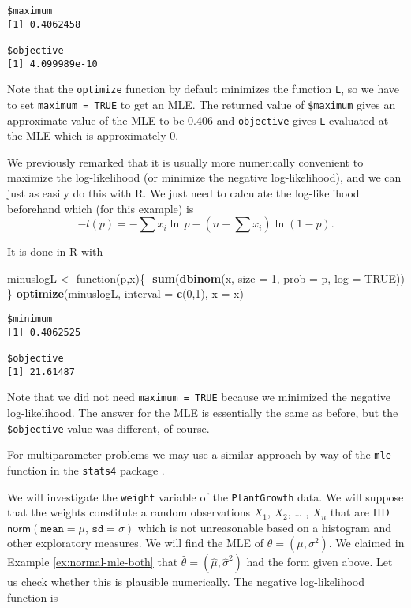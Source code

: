 \documentclass[]{book}
\newenvironment{Shaded}{\begin{snugshade}}{\end{snugshade}}
\newcommand{\KeywordTok}[1]{\textcolor[rgb]{0.13,0.29,0.53}{\textbf{{#1}}}}
\newcommand{\DataTypeTok}[1]{\textcolor[rgb]{0.13,0.29,0.53}{{#1}}}
\newcommand{\DecValTok}[1]{\textcolor[rgb]{0.00,0.00,0.81}{{#1}}}
\newcommand{\StringTok}[1]{\textcolor[rgb]{0.31,0.60,0.02}{{#1}}}
\newcommand{\OtherTok}[1]{\textcolor[rgb]{0.56,0.35,0.01}{{#1}}}
\newcommand{\NormalTok}[1]{{#1}}
\numberwithin{equation}{chapter}
\numberwithin{figure}{chapter}
\theoremstyle{plain}
\theoremstyle{definition}
\theoremstyle{remark}
\theoremstyle{definition}
\theoremstyle{definition}
\theoremstyle{remark}
\let\BeginKnitrBlock\begin \let\EndKnitrBlock\end
\begin{document}
\begin{verbatim}
$maximum
[1] 0.4062458

$objective
[1] 4.099989e-10
\end{verbatim}

Note that the \texttt{optimize} function by default minimizes the
function \texttt{L}, so we have to set \texttt{maximum\ =\ TRUE} to get
an MLE. The returned value of \texttt{\$maximum} gives an approximate
value of the MLE to be 0.406 and \texttt{objective} gives \texttt{L}
evaluated at the MLE which is approximately 0.

We previously remarked that it is usually more numerically convenient to
maximize the log-likelihood (or minimize the negative log-likelihood),
and we can just as easily do this with R. We just need to calculate the
log-likelihood beforehand which (for this example) is
\[ -l(p)=-\sum x_{i}\ln\,
p-\left(n-\sum x_{i}\right)\ln(1-p).  \]

It is done in R with

\begin{Shaded}
\begin{Highlighting}[]
\NormalTok{minuslogL <-}\StringTok{ }\NormalTok{function(p,x)\{}
                \NormalTok{-}\KeywordTok{sum}\NormalTok{(}\KeywordTok{dbinom}\NormalTok{(x, }\DataTypeTok{size =} \DecValTok{1}\NormalTok{, }\DataTypeTok{prob =} \NormalTok{p, }\DataTypeTok{log =} \OtherTok{TRUE}\NormalTok{))}
             \NormalTok{\}}
\KeywordTok{optimize}\NormalTok{(minuslogL, }\DataTypeTok{interval =} \KeywordTok{c}\NormalTok{(}\DecValTok{0}\NormalTok{,}\DecValTok{1}\NormalTok{), }\DataTypeTok{x =} \NormalTok{x)}
\end{Highlighting}
\end{Shaded}

\begin{verbatim}
$minimum
[1] 0.4062525

$objective
[1] 21.61487
\end{verbatim}

Note that we did not need \texttt{maximum\ =\ TRUE} because we minimized
the negative log-likelihood. The answer for the MLE is essentially the
same as before, but the \texttt{\$objective} value was different, of
course.

For multiparameter problems we may use a similar approach by way of the
\texttt{mle} function in the \texttt{stats4} package \autocite{stats4}.

\bigskip

\BeginKnitrBlock{example}[Plant Growth]
\protect\hypertarget{ex:unnamed-chunk-350}{}{\label{ex:unnamed-chunk-350}
\iffalse (Plant Growth) \fi }We will investigate the \texttt{weight}
variable of the \texttt{PlantGrowth} data. We will suppose that the
weights constitute a random observations \(X_{1}\), \(X_{2}\), \ldots{}
, \(X_{n}\) that are IID
\(\mathsf{norm}(\mathtt{mean}=\mu,\,\mathtt{sd}=\sigma)\) which is not
unreasonable based on a histogram and other exploratory measures. We
will find the MLE of \(\theta=(\mu,\sigma^{2})\). We claimed in Example
\ref{ex:normal-mle-both} that
\(\hat{\theta}=(\hat{\mu},\hat{\sigma}^{2})\) had the form given above.
Let us check whether this is plausible numerically. The negative
log-likelihood function is
\EndKnitrBlock{example}
\end{document}
